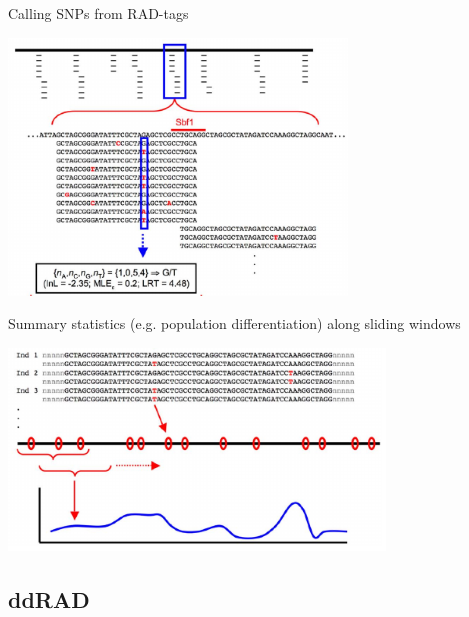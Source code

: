 \documentclass[presentation]{beamer}
\begin{document}
\begin{frame}[label=sec-2-1-9]{Calling SNPs from RAD-tags}
\begin{center}
\includegraphics[width=9cm]{HohenloheFig2a.png}



\tiny{\citep{Hohenlohe2010}}
\end{center}
\end{frame}


\begin{frame}[label=sec-2-1-10]{Summary statistics (e.g. population differentiation) along sliding windows}
\begin{center}

\includegraphics[width=10cm]{HohenloheFig2b.png}

\tiny{\citep{Hohenlohe2010}}
\end{center}
\end{frame}




\subsection{ddRAD}
\label{sec-2-2}
\end{document}
